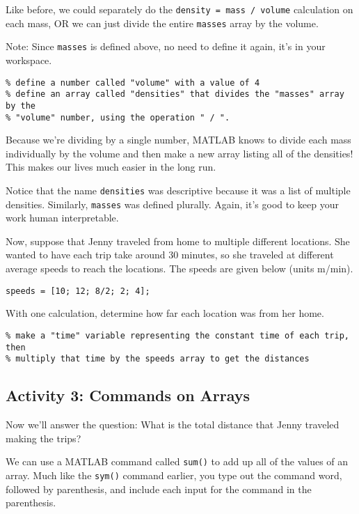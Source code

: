 \documentclass{ximera}
\begin{document}
Like before, we could separately do the \texttt{density = mass / volume} calculation on each mass, OR we can just divide the entire \texttt{masses} array by the volume.

\begin{remark}
Note: Since \texttt{masses} is defined above, no need to define it again, it's in your workspace.
\end{remark}

\begin{verbatim}
% define a number called "volume" with a value of 4
% define an array called "densities" that divides the "masses" array by the
% "volume" number, using the operation " / ".
\end{verbatim}

Because we're dividing by a single number, MATLAB knows to divide each mass individually by the volume and then make a new array listing all of the densities! This makes our lives much easier in the long run.

Notice that the name \texttt{densities} was descriptive because it was a list of multiple densities. Similarly, \texttt{masses} was defined plurally. Again, it's good to keep your work human interpretable.

Now, suppose that Jenny traveled from home to multiple different locations. She wanted to have each trip take around 30 minutes, so she traveled at different average speeds to reach the locations. The speeds are given below (units m/min).

\begin{verbatim}
speeds = [10; 12; 8/2; 2; 4];
\end{verbatim}

With one calculation, determine how far each location was from her home.

\begin{verbatim}
% make a "time" variable representing the constant time of each trip, then
% multiply that time by the speeds array to get the distances
\end{verbatim}

\subsection*{Activity 3: Commands on Arrays}

Now we'll answer the question: What is the total distance that Jenny traveled making the trips?

We can use a MATLAB command called \texttt{sum()} to add up all of the values of an array. Much like the \texttt{sym()} command earlier, you type out the command word, followed by parenthesis, and include each input for the command in the parenthesis.
\end{document}
